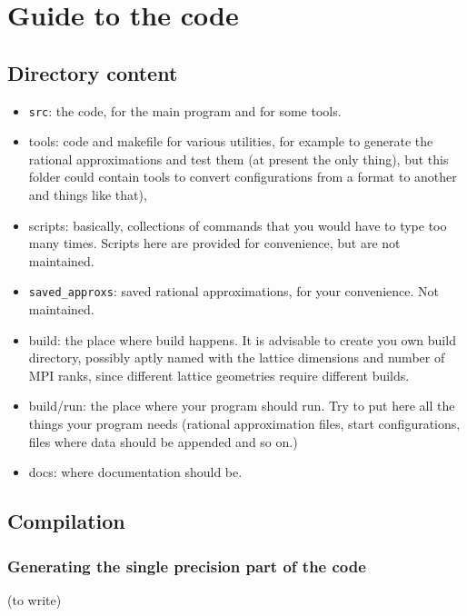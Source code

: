 
\chapter{Guide to the code}

\section{Directory content}

\begin{itemize}
    \item \texttt{src}: the code, for the main program and for some tools.
    \item tools: code and makefile for various utilities, for example to 
generate the rational
        approximations and test them (at present the only thing), but this
        folder could contain tools to convert configurations from a format to
        another and things like that), 
    \item scripts: basically, collections of commands that you would have to
        type too many times. Scripts here are provided for convenience, but are 
        not maintained.
    \item \verb|saved_approxs|: saved rational approximations, for your 
        convenience. Not maintained.
    \item build: the place where build happens. It is advisable to create you 
own build directory, possibly aptly named with the lattice dimensions and 
number of MPI ranks, since different lattice geometries require different 
builds.
    \item build/run: the place where your program should run. Try to put here
        all the things your program needs (rational approximation files,
        start configurations, files where data should be appended and so on.)
    \item docs: where documentation should be.
\end{itemize}



\section{Compilation}
\label{compilation}
\subsection{Generating the single precision part of the code}
(to write)
